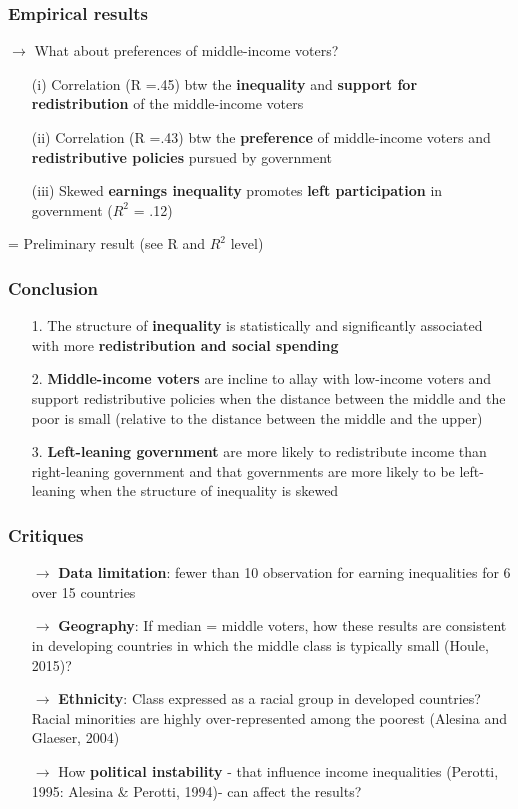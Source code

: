 \documentclass{beamer}
\begin{document}
\begin{frame}
\frametitle{Empirical results}
$\longrightarrow$  What about preferences of middle-income voters?
\medskip
\begin{itemize}
\item[(i)] Correlation (R =.45) btw the \textbf{inequality} and \textbf{support for redistribution} of the middle-income voters  
\item[(ii)] Correlation (R =.43)  btw the \textbf{preference} of middle-income voters and \textbf{redistributive policies} pursued by government
\item[(iii)] Skewed \textbf{earnings inequality} promotes \textbf{left participation} in government ($R^{2}$ = .12)
\end{itemize}
\medskip
\begin{center}
= Preliminary result (see R and $R^{2}$ level)\\
\end{center}
\end{frame}
\begin{frame}
\frametitle{Conclusion}
\begin{itemize}
\item[1.] The structure of \textbf{inequality} is statistically and significantly associated with more \textbf{redistribution and social spending}
\medskip
\medskip
\medskip
\item[2.] \textbf{Middle-income voters} are incline to allay with low-income voters and support redistributive policies when the distance between the middle and the poor is small (relative to the distance between the middle and the upper)
\medskip
\medskip
\medskip
\item[3.] \textbf{Left-leaning government} are more likely to redistribute income than right-leaning government and that governments are more likely to be left-leaning when the structure of inequality is skewed
\end{itemize}
\end{frame}

\begin{frame}
\frametitle{Critiques}
\begin{itemize}
\item[$\longrightarrow$]\textbf{Data limitation}: fewer than 10 observation for earning inequalities for 6 over 15 countries
\item[$\longrightarrow$] \textbf{Geography}: If median = middle voters, how these results are consistent in developing countries in which the middle class is typically small (Houle, 2015)?
\item[$\longrightarrow$] \textbf{Ethnicity}: Class expressed as a racial group in developed countries? Racial minorities are highly over-represented among the poorest (Alesina and Glaeser, 2004)
\item[$\longrightarrow$] How \textbf{political instability} - that influence income inequalities (Perotti, 1995: Alesina \& Perotti, 1994)- can affect the results? 
\end{itemize}
\end{frame}
\end{document}
